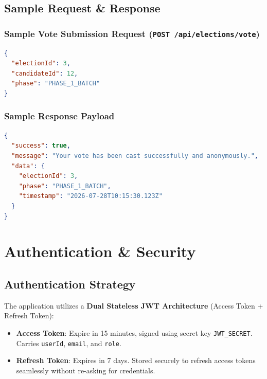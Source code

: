 \documentclass[12pt, a4paper]{article}
\begin{document}
\subsection{Sample Request \& Response}

\subsubsection{Sample Vote Submission Request (\texttt{POST /api/elections/vote})}
\begin{lstlisting}[language=json, caption={Cast Vote Request Payload}]
{
  "electionId": 3,
  "candidateId": 12,
  "phase": "PHASE_1_BATCH"
}
\end{lstlisting}

\subsubsection{Sample Response Payload}
\begin{lstlisting}[language=json, caption={Vote Submission Response Payload}]
{
  "success": true,
  "message": "Your vote has been cast successfully and anonymously.",
  "data": {
    "electionId": 3,
    "phase": "PHASE_1_BATCH",
    "timestamp": "2026-07-28T10:15:30.123Z"
  }
}
\end{lstlisting}

\section{Authentication \& Security}

\subsection{Authentication Strategy}
The application utilizes a \textbf{Dual Stateless JWT Architecture} (Access Token + Refresh Token):
\begin{itemize}
    \item \textbf{Access Token}: Expire in 15 minutes, signed using secret key \texttt{JWT\_SECRET}. Carries \texttt{userId}, \texttt{email}, and \texttt{role}.
    \item \textbf{Refresh Token}: Expires in 7 days. Stored securely to refresh access tokens seamlessly without re-asking for credentials.
\end{itemize}
\end{document}
